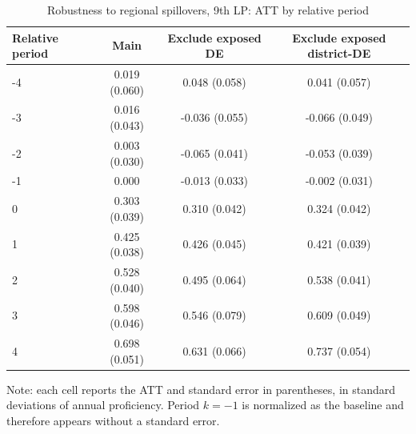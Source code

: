 ﻿\begin{table}[!htbp]
\centering
\caption{Robustness to regional spillovers, 9th LP: ATT by relative period}
\label{tab:ap_event_spillover_9th_lp}
\vspace{-0.15cm}
\scriptsize
\setlength{\tabcolsep}{4pt}
\renewcommand{\arraystretch}{0.92}
\begin{tabular}{lccc}
\toprule
Relative period & Main & Exclude exposed DE & Exclude exposed district-DE \\
\midrule
-4 & 0.019 (0.060) & 0.048 (0.058) & 0.041 (0.057) \\
-3 & 0.016 (0.043) & -0.036 (0.055) & -0.066 (0.049) \\
-2 & 0.003 (0.030) & -0.065 (0.041) & -0.053 (0.039) \\
-1 & 0.000 & -0.013 (0.033) & -0.002 (0.031) \\
0 & 0.303 (0.039) & 0.310 (0.042) & 0.324 (0.042) \\
1 & 0.425 (0.038) & 0.426 (0.045) & 0.421 (0.039) \\
2 & 0.528 (0.040) & 0.495 (0.064) & 0.538 (0.041) \\
3 & 0.598 (0.046) & 0.546 (0.079) & 0.609 (0.049) \\
4 & 0.698 (0.051) & 0.631 (0.066) & 0.737 (0.054) \\
\bottomrule
\end{tabular}
\begin{flushleft}
\footnotesize Note: each cell reports the ATT and standard error in parentheses, in standard deviations of annual proficiency. Period \(k=-1\) is normalized as the baseline and therefore appears without a standard error.
\end{flushleft}
\end{table}



